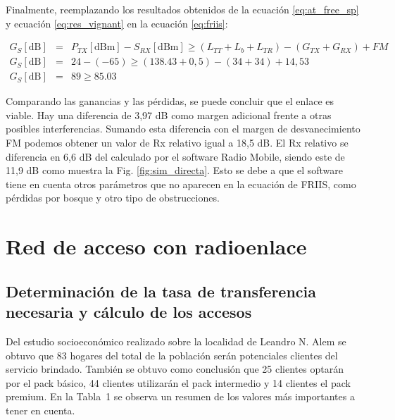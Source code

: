 \documentclass[11pt,a4paper]{article}
\begin{document}
Finalmente, reemplazando los resultados obtenidos de la ecuación \ref{eq:at_free_sp} y ecuación \ref{eq:res_vignant} en la ecuación \ref{eq:friis}: 

\begin{eqnarray*}
  G_S[\text{dB}]&=&P_{TX}[\text{dBm}]-S_{RX}[\text{dBm}] \geq (L_{TT}+L_b+L_{TR}) -(G_{TX}+G_{RX})+FM \\ 
G_S[\text{dB}]&=&24-(-65) \geq  (138.43+0,5)-(34+34)+14,53 \\ 
G_S[\text{dB}]&=&89 \geq 85.03 
\end{eqnarray*}

Comparando las ganancias y las pérdidas, se puede concluir que el enlace es viable. 
Hay una diferencia de 3,97 dB como margen adicional frente a otras posibles interferencias. 
Sumando esta diferencia con el margen de desvanecimiento FM podemos obtener un valor de Rx relativo igual a 18,5 dB. 
El Rx relativo se diferencia en 6,6 dB del calculado por el software Radio Mobile, siendo este de 11,9 dB como muestra la Fig. \ref{fig:sim_directa}. 
Esto se debe a que el software tiene en cuenta otros parámetros que no aparecen en la ecuación de FRIIS, como pérdidas por bosque y otro tipo de obstrucciones.

\section{Red de acceso con radioenlace}

\subsection{Determinación de la tasa de transferencia necesaria y cálculo de los accesos}

Del estudio socioeconómico realizado sobre la localidad de Leandro N. Alem se obtuvo que 83 hogares del total de la población serán potenciales clientes del servicio brindado. 
También se obtuvo como conclusión que 25 clientes optarán por el pack básico, 44 clientes utilizarán el pack intermedio y 14 clientes el pack premium. 
En la Tabla~1 se observa un resumen de los valores más importantes a tener en cuenta.
\end{document}
